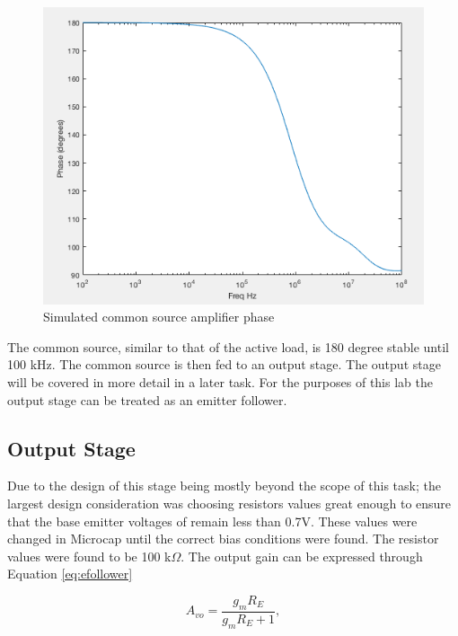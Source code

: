 \begin{figure}[H]
	\begin{center}
		\includegraphics[scale=.40]{Simulations/phasecommonsource.png}
		\caption{Simulated common source amplifier phase}
		\label{fig:csphase}
	\end{center}
\end{figure} 

The common source, similar to that of the active load, is 180 degree stable until 100 kHz.  The common source is then fed to an output stage. The output stage will be covered in more detail in a later task. For the purposes of this lab the output stage can be treated as an emitter follower.

\subsection{Output Stage}

Due to the design of this stage being mostly beyond the scope of this task; the largest design consideration was choosing resistors values great enough to ensure that the base emitter voltages of remain less than 0.7V. These values were changed in Microcap until the correct bias conditions were found. The resistor values were found to be 100 k$\Omega$. The output gain can be expressed through Equation \ref{eq:efollower}

\begin{equation}
A_{vo} = \frac{g_mR_E}{g_mR_E + 1},
\label{eq:efollower}
\end{equation}

